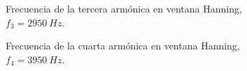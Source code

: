 \begin{figure}[H]
\begin{subfigure}[H]{0.48\textwidth}
        \end{subfigure}
        \begin{subfigure}[H]{0.48\textwidth}
          \caption{Frecuencia de la tercera armónica en ventana Hanning, $f_{3}=2950~Hz$.}
        \end{subfigure}
       \hfill
        \begin{subfigure}[H]{0.48\textwidth}
          \caption{Frecuencia de la cuarta armónica en ventana Hanning, $f_{4}=3950~Hz$.}
        \end{subfigure}
        \begin{subfigure}[H]{0.48\textwidth}

\end{subfigure}
\end{figure}
